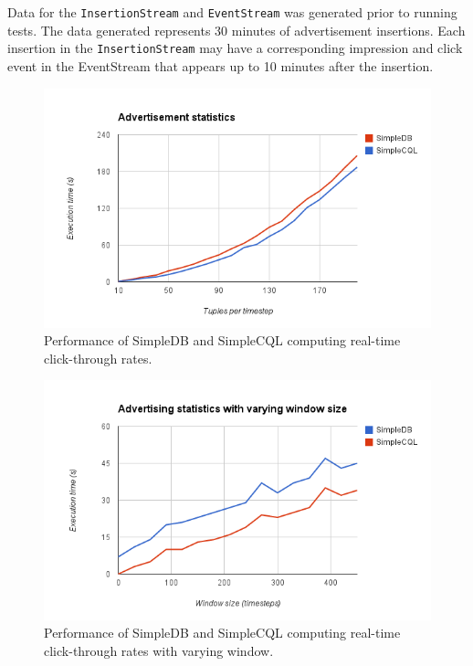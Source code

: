 \documentclass[a4paper, 10pt, conference]{IEEEconf}
\begin{document}
\vspace{3mm}

Data for the \texttt{InsertionStream} and \texttt{EventStream} was generated prior to running tests.  The data generated represents 30 minutes of advertisement insertions.  Each insertion in the \texttt{InsertionStream} may have a corresponding impression and click event in the EventStream that appears up to 10 minutes after the insertion.

\begin{figure}[h!]
    \centering
    \centerline{\includegraphics[totalheight=5cm]{ads.png}}
    \caption{Performance of SimpleDB and SimpleCQL computing real-time click-through rates.}
    \label{fig:ads}
\end{figure}

\begin{figure}[h!]
    \centering
    \centerline{\includegraphics[totalheight=5cm]{ads_window.png}}
    \caption{Performance of SimpleDB and SimpleCQL computing real-time click-through rates with varying window.}
    \label{fig:ads_window}
\end{figure}
\end{document}
